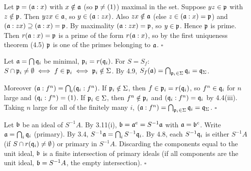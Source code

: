 \documentclass[11pt]{article}
\begin{document}
\pf
Let $\mathfrak p=(\mathfrak a:x)$ with $x\notin\mathfrak a$ (so $\mathfrak p\ne(1)$) maximal in the set. Suppose $yz\in\mathfrak p$ with $z\notin\mathfrak p$. Then $yzx\in\mathfrak a$, so $y\in(\mathfrak a:zx)$. Also $zx\notin\mathfrak a$ (else $z\in(\mathfrak a:x)=\mathfrak p$) and $(\mathfrak a:zx)\supseteq(\mathfrak a:x)=\mathfrak p$. By maximality $(\mathfrak a:zx)=\mathfrak p$, so $y\in\mathfrak p$. Hence $\mathfrak p$ is prime. Then $r(\mathfrak a:x)=\mathfrak p$ is a prime of the form $r(\mathfrak a:x)$, so by the first uniqueness theorem (4.5) $\mathfrak p$ is one of the primes belonging to $\mathfrak a$. \hfill$\square$

\pf
Let $\mathfrak a=\bigcap\mathfrak q_i$ be minimal, $\mathfrak p_i=r(\mathfrak q_i)$. For $S=S_f$: $S\cap\mathfrak p_i\ne\emptyset\iff f\in\mathfrak p_i\iff\mathfrak p_i\notin\Sigma$. By 4.9, $S_f(\mathfrak a)=\bigcap_{\mathfrak p_i\in\Sigma}\mathfrak q_i=\mathfrak q_\Sigma$.

Moreover $(\mathfrak a:f^n)=\bigcap_i(\mathfrak q_i:f^n)$. If $\mathfrak p_i\notin\Sigma$, then $f\in\mathfrak p_i=r(\mathfrak q_i)$, so $f^n\in\mathfrak q_i$ for $n$ large and $(\mathfrak q_i:f^n)=(1)$. If $\mathfrak p_i\in\Sigma$, then $f^n\notin\mathfrak p_i$ and $(\mathfrak q_i:f^n)=\mathfrak q_i$ by 4.4(iii). Taking $n$ large for all of the finitely many $i$, $(\mathfrak a:f^n)=\bigcap_{\mathfrak p_i\in\Sigma}\mathfrak q_i=\mathfrak q_\Sigma$. \hfill$\square$

\pf
Let $\mathfrak b$ be an ideal of $S^{-1}A$. By 3.11(i), $\mathfrak b=\mathfrak a^e=S^{-1}\mathfrak a$ with $\mathfrak a=\mathfrak b^c$. Write $\mathfrak a=\bigcap_i\mathfrak q_i$ (primary). By 3.4, $S^{-1}\mathfrak a=\bigcap_iS^{-1}\mathfrak q_i$. By 4.8, each $S^{-1}\mathfrak q_i$ is either $S^{-1}A$ (if $S\cap r(\mathfrak q_i)\ne\emptyset$) or primary in $S^{-1}A$. Discarding the components equal to the unit ideal, $\mathfrak b$ is a finite intersection of primary ideals (if all components are the unit ideal, $\mathfrak b=S^{-1}A$, the empty intersection). \hfill$\square$
\end{document}
